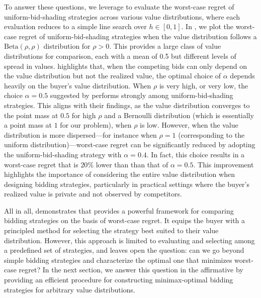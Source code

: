 To answer these questions, we leverage  to evaluate the worst-case regret of uniform-bid-shading strategies across various value distributions, where each evaluation reduces to a simple line search over $h \in [0,1]$. In , we plot the worst-case regret of uniform-bid-shading strategies when the value distribution follows a $\mathrm{Beta}(\rho,\rho)$ distribution for $\rho > 0$. This provides a large class of value distributions for comparison, each with a mean of 0.5 but different levels of spread in values.  highlights that, when the competing bids can only depend on the value distribution but not the realized value, the optimal choice of $\alpha$ depends heavily on the buyer's value distribution. When $\rho$ is very high, or very low, the choice $\alpha =0.5$ suggested by \cite{kasberger2023robust} performs strongly among uniform-bid-shading strategies. This aligns with their findings, as the value distribution converges to the point mass at $0.5$ for high $\rho$ and a Bernoulli distribution (which is essentially a point mass at $1$ for our problem), when $\rho$ is low. However, when the value distribution is more dispersed---for instance when $\rho = 1$ (corresponding to the uniform distribution)---worst-case regret can be significantly reduced by adopting the uniform-bid-shading strategy with $\alpha = 0.4$. In fact, this choice results in a worst-case regret that is $20\%$ lower than than that of $\alpha = 0.5$.  This improvement highlights the importance of considering the entire value distribution when designing bidding strategies, particularly in practical settings where the buyer's realized value is private and not observed by competitors.


All in all,  demonstrates that  provides a powerful framework for comparing bidding strategies on the basis of worst-case regret. It equips the buyer with a principled method for selecting the strategy best suited to their value distribution. However, this approach is limited to evaluating and selecting among a predefined set of strategies, and leaves open the question: can we go beyond simple bidding strategies and characterize the optimal one that minimizes worst-case regret? In the next section, we answer this question in the affirmative by providing an efficient procedure for constructing minimax-optimal bidding strategies for arbitrary value distributions.